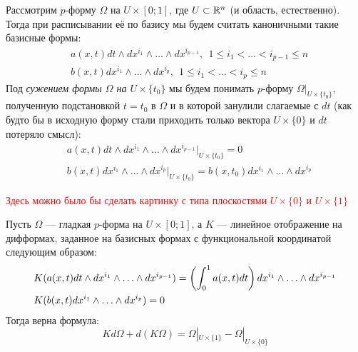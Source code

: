 \begin{note}
	Рассмотрим $p$-форму $\Omega$ на $U \times [0; 1]$, где $U \subset \mathbb{R}^n$ (и область, естественно). Тогда при расписывании её по базису мы будем считать каноничными такие базисные формы:
	\begin{align*}
		&{a(x, t)dt \wedge dx^{i_1} \wedge \ldots \wedge dx^{i_{p - 1}},\ \ 1 \le i_1 < \ldots < i_{p - 1} \le n}
		\\
		&{b(x, t)dx^{i_1} \wedge \ldots \wedge dx^{i_p},\ \ 1 \le i_1 < \ldots < i_p \le n}
	\end{align*}
	Под \textit{сужением формы $\Omega$ на $U \times \{t_0\}$} мы будем понимать $p$-форму $\Omega|_{U \times \{t_0\}}$, полученную подстановкой $t = t_0$ в $\Omega$ и в которой занулили слагаемые с $dt$ (как будто бы в исходную форму стали приходить только вектора $U \times \{0\}$ и $dt$ потеряло смысл):
	\begin{align*}
		&{a(x, t)dt \wedge dx^{i_1} \wedge \ldots \wedge dx^{i_{p - 1}}|_{U \times \{t_0\}} = 0}
		\\
		&{b(x, t)dx^{i_1} \wedge \ldots \wedge dx^{i_p}|_{U \times \{t_0\}} = b(x, t_0)dx^{i_1} \wedge \ldots \wedge dx^{i_p}}
	\end{align*}
\end{note}

\textcolor{red}{Здесь можно было бы сделать картинку с типа плоскостями $U \times \{0\}$ и $U \times \{1\}$}

\begin{lemma}
	Пусть $\Omega$ --- гладкая $p$-форма на $U \times [0; 1]$, а $K$ --- линейное отображение на дифформах, заданное на базисных формах с функциональной координатой следующим образом:
	\begin{align*}
		&{K(a(x, t)dt \wedge dx^{i_1} \wedge \ldots \wedge dx^{i_{p - 1}}) = \left(\int_0^1 a(x, t)dt\right)dx^{i_1} \wedge \ldots \wedge dx^{i_{p - 1}}}
		\\
		&{K(b(x, t)dx^{i_1} \wedge \ldots \wedge dx^{i_p}) = 0}
	\end{align*}
	Тогда верна формула:
	\[
		Kd\Omega + d(K\Omega) = \Omega|_{U \times \{1\}} - \Omega|_{U \times \{0\}}
	\]
\end{lemma}

